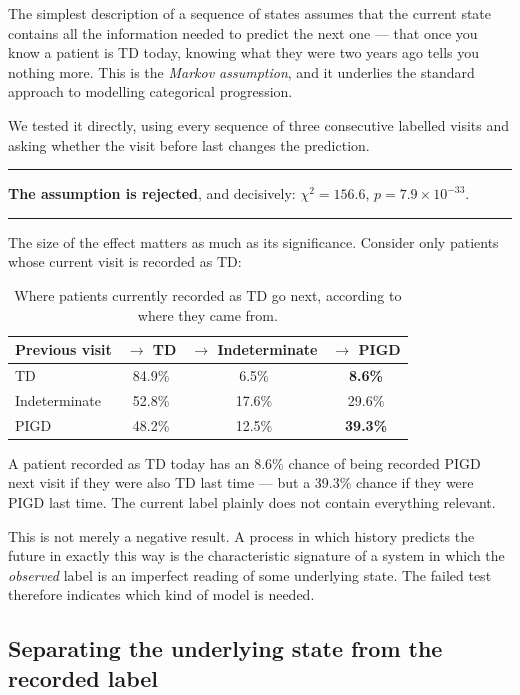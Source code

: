 \documentclass[11pt,a4paper]{article}
\newenvironment{keypoint}
  {\begin{center}\begin{minipage}{0.94\textwidth}%
   \vspace{4pt}\hrule\vspace{7pt}\small}
  {\vspace{7pt}\hrule\vspace{4pt}\end{minipage}\end{center}}
\begin{document}
The simplest description of a sequence of states assumes that the current state
contains all the information needed to predict the next one --- that once you
know a patient is TD today, knowing what they were two years ago tells you
nothing more. This is the \emph{Markov assumption}, and it underlies the
standard approach to modelling categorical progression.

We tested it directly, using every sequence of three consecutive labelled visits
and asking whether the visit before last changes the prediction.

\begin{keypoint}
\textbf{The assumption is rejected}, and decisively: $\chi^2 = 156.6$,
$p = 7.9 \times 10^{-33}$.
\end{keypoint}

\noindent
The size of the effect matters as much as its significance. Consider only
patients whose current visit is recorded as TD:

\begin{table}[H]
\centering
\begin{tabular}{@{}lccc@{}}
\toprule
\textbf{Previous visit} & \textbf{$\rightarrow$ TD} & \textbf{$\rightarrow$ Indeterminate} & \textbf{$\rightarrow$ PIGD} \\
\midrule
TD             & 84.9\% & \phantom{0}6.5\% & \phantom{0}\textbf{8.6\%} \\
Indeterminate  & 52.8\% & 17.6\%           & 29.6\% \\
PIGD           & 48.2\% & 12.5\%           & \textbf{39.3\%} \\
\bottomrule
\end{tabular}
\caption{Where patients currently recorded as TD go next, according to where
they came from.}
\end{table}

\noindent
A patient recorded as TD today has an 8.6\% chance of being recorded PIGD next
visit if they were also TD last time --- but a 39.3\% chance if they were PIGD
last time. The current label plainly does not contain everything relevant.

This is not merely a negative result. A process in which history predicts the
future in exactly this way is the characteristic signature of a system in which
the \emph{observed} label is an imperfect reading of some underlying state. The
failed test therefore indicates which kind of model is needed.

\subsection{Separating the underlying state from the recorded label}
\end{document}
